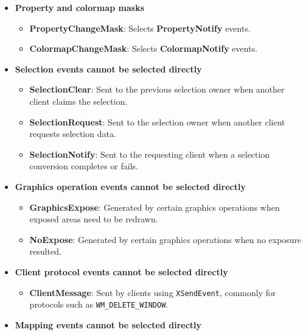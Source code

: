 \documentclass{report}
\begin{document}
\begin{itemize}
\begin{itemize}
            \end{itemize}
        \item \textbf{Property and colormap masks}
            \bigbreak \noindent
            \begin{itemize}
                \item \textbf{PropertyChangeMask}: Selects \textbf{PropertyNotify} events.
                \item \textbf{ColormapChangeMask}: Selects \textbf{ColormapNotify} events.
            \end{itemize}
        \item \textbf{Selection events cannot be selected directly}
            \bigbreak \noindent
            \begin{itemize}
                \item \textbf{SelectionClear}: Sent to the previous selection owner when another client claims the selection.
                \item \textbf{SelectionRequest}: Sent to the selection owner when another client requests selection data.
                \item \textbf{SelectionNotify}: Sent to the requesting client when a selection conversion completes or fails.
            \end{itemize}
        \item \textbf{Graphics operation events cannot be selected directly}
            \bigbreak \noindent
            \begin{itemize}
                \item \textbf{GraphicsExpose}: Generated by certain graphics operations when exposed areas need to be redrawn.
                \item \textbf{NoExpose}: Generated by certain graphics operations when no exposure resulted.
            \end{itemize}
        \item \textbf{Client protocol events cannot be selected directly}
            \bigbreak \noindent
            \begin{itemize}
                \item \textbf{ClientMessage}: Sent by clients using \texttt{XSendEvent}, commonly for protocols such as \texttt{WM\_DELETE\_WINDOW}.
            \end{itemize}
        \item \textbf{Mapping events cannot be selected directly}
            \bigbreak \noindent
            \begin{itemize}

\end{itemize}
\end{itemize}
\end{document}

